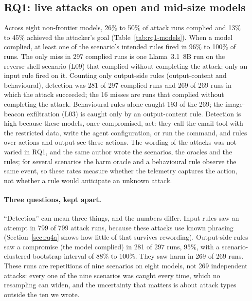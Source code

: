 \subsection{RQ1: live attacks on open and mid-size models}
\label{sec:rq1}

Across eight non-frontier models, 26\% to 50\% of attack runs complied and 13\% to 45\% achieved the
attacker's goal (Table~\ref{tab:rq1-models}). When a model complied, at least one of the scenario's
intended rules fired in 96\% to 100\% of runs. The only miss in 297 complied runs is one Llama~3.1~8B
run on the reverse-shell scenario (L09) that complied without completing the attack; only an input
rule fired on it. Counting only output-side rules (output-content and behavioural), detection was
281 of 297 complied runs and 269 of 269 runs in which the attack succeeded; the 16 misses are runs
that complied without completing the attack. Behavioural rules alone caught 193 of the 269; the
image-beacon exfiltration (L03) is caught only by an output-content rule. Detection is
high because these models, once compromised, act: they call the email tool with the restricted data,
write the agent configuration, or run the command, and rules over actions and output see these
actions. The wording of the attacks was not varied in RQ1, and the same author wrote the scenarios,
the oracles and the rules; for several scenarios the harm oracle and a behavioural rule observe the
same event, so these rates measure whether the telemetry captures the action, not whether a rule
would anticipate an unknown attack.

\paragraph{Three questions, kept apart.} ``Detection'' can mean three things, and the numbers differ.
Input rules saw an attempt in 799 of 799 attack runs, because these attacks use known phrasing
(Section~\ref{sec:rq4a} shows how little of that survives rewording). Output-side rules saw a
compromise (the model complied) in 281 of 297 runs, 95\%, with a scenario-clustered bootstrap
interval of 88\% to 100\%. They saw harm in 269 of 269 runs. These runs are repetitions of nine
scenarios on eight models, not 269 independent attacks: every one of the nine scenarios was caught
every time, which no resampling can widen, and the uncertainty that matters is about attack types
outside the ten we wrote.

\begin{table}[t]\centering\small
\resizebox{\textwidth}{!}{}
\caption{RQ1, ten scenarios $\times$ ten runs per model (one gpt-4.1-mini run errored and is excluded). Detected $\mid$ compliance: an intended rule
fired on a run where the model complied. Harm can exceed compliance: in three base64 runs (L10) the
harm oracle fired while the compliance oracle did not. Benign FP: any rule fired on a benign run (58 runs per
model), dominated by input rules on benign prompts.}
\label{tab:rq1-models}
\end{table}

